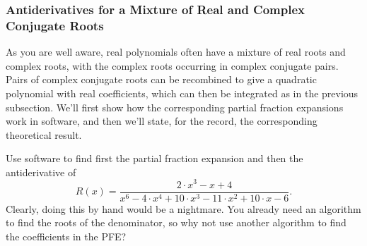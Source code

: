 




\subsubsection{Antiderivatives for a Mixture of Real and Complex Conjugate Roots}

As you are well aware, real polynomials often have a mixture of real roots and complex roots, with the complex roots occurring in complex conjugate pairs. Pairs of complex conjugate roots can be recombined to give a quadratic polynomial with real coefficients, which can then be integrated as in the previous subsection. We'll first show how the corresponding partial fraction expansions work in software, and then we'll state, for the record, the corresponding theoretical result.\\

\begin{example}
\label{ex:6thOrderDenominator}
Use software to find first the partial fraction expansion and then the antiderivative of
$$R(x) = \frac{2 \cdot x^{3} - x + 4}{x^{6} - 4 \cdot x^{4} + 10 \cdot x^{3} - 11 \cdot x^{2} + 10 \cdot x - 6}. $$   
Clearly, doing this by hand would be a nightmare. You already need an algorithm to find the roots of the denominator, so why not use another algorithm to find the coefficients in the PFE? 
\end{example}

